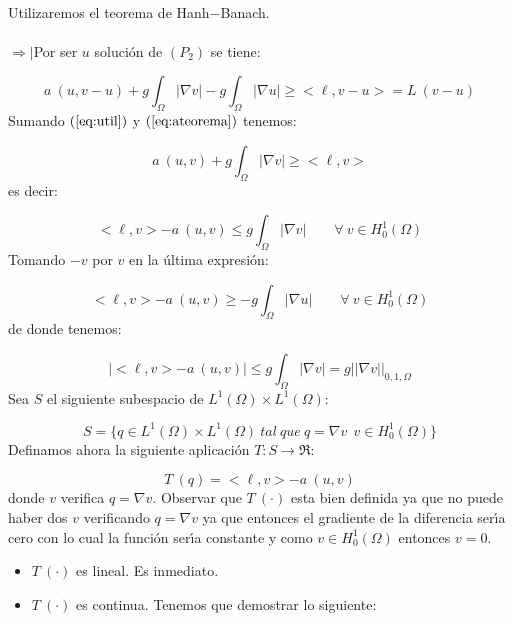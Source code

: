 \begin{demosteorema}
\ \\
Utilizaremos el teorema de Hanh$-$Banach.\\ \\ 
$\Rightarrow |$Por ser $u$ soluci\'on de $(P_2)$ se tiene:

\begin{equation} \label{eq:ateorema}
a\ (u,v-u)+g \int_{\Omega }|\nabla v|-g \int_{\Omega } |\nabla u|
\ge <\ell,v-u>=L\ (v-u)
\end{equation}
Sumando $(\ref{eq:util})$ y $(\ref{eq:ateorema})$ tenemos:

\begin{displaymath}
a\ (u,v)+g \int_{\Omega} |\nabla v|\ge <\ell,v>
\end{displaymath}
es decir:

\begin{displaymath}
<\ell,v>-a\ (u,v) \le g \int_{\Omega} |\nabla v|\qquad \forall \ v \in
H^1_0(\Omega )
\end{displaymath}
Tomando $-v$ por $v$ en la \'ultima expresi\'on:

\begin{displaymath}
<\ell,v> -a\ (u,v) \ge -g \int_{\Omega }|\nabla u|\qquad \forall \ v \in
H^1_0(\Omega )
\end{displaymath}
de donde tenemos:

\begin{equation} \label{eq:cteorema}
|<\ell,v>-a\ (u,v)|\le g \int_{\Omega }|\nabla v| = g
||\nabla v||_{0,1,\Omega }
\end{equation}
Sea $S$ el siguiente subespacio de $L^1(\Omega )\times L^1(\Omega )$:

\begin{displaymath}
S=\{q \in L^1(\Omega )\times L^1(\Omega )\ tal\ que\ q=\nabla v\ \ v\in
H^1_0(\Omega ) \}
\end{displaymath}
Definamos ahora la siguiente aplicaci\'on $T:S\longrightarrow \Re$:

\begin{displaymath}
T\ (q) = <\ell,v>-a\ (u,v)
\end{displaymath}
donde $v$ verifica $q=\nabla v$. Observar que $T\ (\cdot )$ esta bien definida
ya que no puede haber dos $v$ verificando $q=\nabla v$ ya que entonces el
gradiente de la diferencia ser\'{\i}a cero con lo cual la funci\'on ser\'{\i}a
constante y como $v \in H^1_0(\Omega )$ entonces $v=0$.

\begin{itemize}
\item $T\ (\cdot )$ es lineal. Es inmediato.
\item $T\ (\cdot )$ es continua. Tenemos que demostrar lo siguiente:


\end{itemize}
\end{demosteorema}

